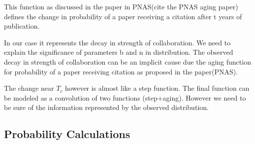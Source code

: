 \documentclass[aps, pre, twocolumn, nofootinbib]{revtex4-1}
\begin{document}
This function as discussed in the paper in PNAS(cite the PNAS aging paper) defines the change in probability of a paper receiving a citation after t years of publication. 

In our case it represents the decay in strength of collaboration. We need to explain the significance of parameters b and n in distribution. The observed decay in strength of collaboration can be an implicit cause due the aging function for probability of a paper receiving citation as proposed in the paper(PNAS). 

The change near $T_c$ however is almost like a step function. The final function can be modeled as a convolution of two functions (step+aging). However we need to be sure of the information represented by the observed distribution.

\subsection{Probability Calculations}
\end{document}
